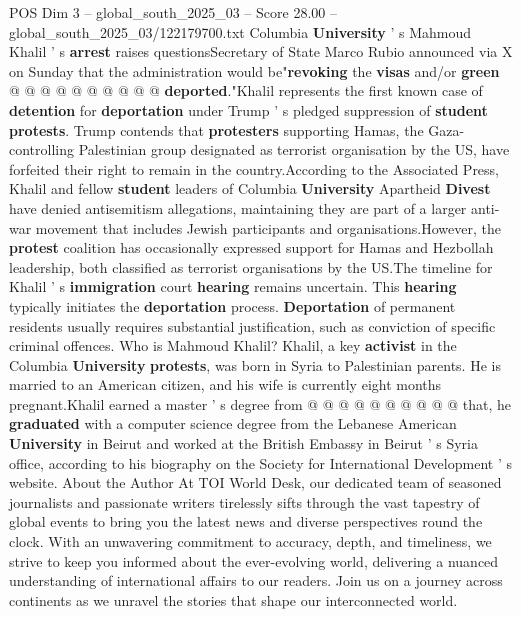 \begin{textsample}{POS Dim 3 – global\_south\_2025\_03 – Score 28.00 – global\_south\_2025\_03/122179700.txt}
Columbia \textbf{University} ' s Mahmoud Khalil ' s \textbf{arrest} raises questionsSecretary of State Marco Rubio announced via X on Sunday that the administration would be"\textbf{revoking} the \textbf{visas} and/or \textbf{green} @ @ @ @ @ @ @ @ @ @ \textbf{deported}."Khalil represents the first known case of \textbf{detention} for \textbf{deportation} under Trump ' s pledged suppression of \textbf{student} \textbf{protests}.
Trump contends that \textbf{protesters} supporting Hamas, the Gaza-controlling Palestinian group designated as terrorist organisation by the US, have forfeited their right to remain in the country.According to the Associated Press, Khalil and fellow \textbf{student} leaders of Columbia \textbf{University} Apartheid \textbf{Divest} have denied antisemitism allegations, maintaining they are part of a larger anti-war movement that includes Jewish participants and organisations.However, the \textbf{protest} coalition has occasionally expressed support for Hamas and Hezbollah leadership, both classified as terrorist organisations by the US.The timeline for Khalil ' s \textbf{immigration} court \textbf{hearing} remains uncertain.
This \textbf{hearing} typically initiates the \textbf{deportation} process. \textbf{Deportation} of permanent residents usually requires substantial justification, such as conviction of specific criminal offences.
Who is Mahmoud Khalil?
Khalil, a key \textbf{activist} in the Columbia \textbf{University} \textbf{protests}, was born in Syria to Palestinian parents.
He is married to an American citizen, and his wife is currently eight months pregnant.Khalil earned a master ' s degree from @ @ @ @ @ @ @ @ @ @ that, he \textbf{graduated} with a computer science degree from the Lebanese American \textbf{University} in Beirut and worked at the British Embassy in Beirut ' s Syria office, according to his biography on the Society for International Development ' s website.
About the Author At TOI World Desk, our dedicated team of seasoned journalists and passionate writers tirelessly sifts through the vast tapestry of global events to bring you the latest news and diverse perspectives round the clock.
With an unwavering commitment to accuracy, depth, and timeliness, we strive to keep you informed about the ever-evolving world, delivering a nuanced understanding of international affairs to our readers.
Join us on a journey across continents as we unravel the stories that shape our interconnected world.

\end{textsample}
